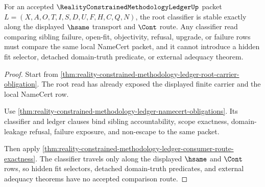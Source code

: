 \begin{theorem}
\label{thm:reality-constrained-methodology-ledger-root-classifier-stability}
For an accepted $\RealityConstrainedMethodologyLedgerUp$ packet $L=(X,A,O,T,I,S,D,U,F,H,C,Q,N)$, the root classifier is stable exactly along the displayed $\hsame$ transport and $\Cont$ route. Any classifier read comparing sibling failure, open-fit, objectivity, refusal, upgrade, or failure rows must compare the same local NameCert packet, and it cannot introduce a hidden fit selector, detached domain-truth predicate, or external adequacy theorem.
\end{theorem}
\begin{proof}
Start from \autoref{thm:reality-constrained-methodology-ledger-root-carrier-obligation}. The root read has already exposed the displayed finite carrier and the local NameCert row.

Use \autoref{thm:reality-constrained-methodology-ledger-namecert-obligations}. Its classifier and ledger clauses bind sibling accountability, scope exactness, domain-leakage refusal, failure exposure, and non-escape to the same packet.

Then apply \autoref{thm:reality-constrained-methodology-ledger-consumer-route-exactness}. The classifier travels only along the displayed $\hsame$ and $\Cont$ rows, so hidden fit selectors, detached domain-truth predicates, and external adequacy theorems have no accepted comparison route.
\end{proof}

